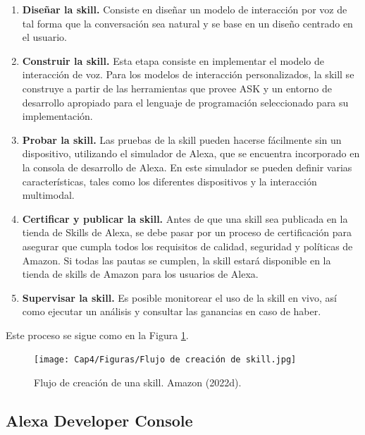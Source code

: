 \begin{enumerate}
  \item \textbf{Diseñar la skill.} Consiste en diseñar un modelo de interacción por voz de tal forma que la conversación sea natural y se base en un diseño centrado en el usuario. 
  \item \textbf{Construir la skill.} Esta etapa consiste en implementar el modelo de interacción de voz. Para los modelos de interacción personalizados, la skill se construye a partir de las herramientas que provee ASK y un entorno de desarrollo apropiado para el lenguaje de programación seleccionado para su implementación.
  \item \textbf{Probar la skill.} Las pruebas de la skill pueden hacerse fácilmente sin un dispositivo, utilizando el simulador de Alexa, que se encuentra incorporado en la consola de desarrollo de Alexa. En este simulador se pueden definir varias características, tales como los diferentes dispositivos y la interacción multimodal.
  \item \textbf{Certificar y publicar la skill.} Antes de que una skill sea publicada en la tienda de Skills de Alexa, se debe pasar por un proceso de certificación para asegurar que cumpla todos los requisitos de calidad, seguridad y políticas de Amazon. Si todas las pautas se cumplen, la skill estará disponible en la tienda de skills de Amazon para los usuarios de Alexa. 
  \item \textbf{Supervisar la skill.} Es posible monitorear el uso de la skill en vivo, así como ejecutar un análisis y consultar las ganancias en caso de haber. 
\end{enumerate}

Este proceso se sigue como en la Figura \ref{fig:42}.

\begin{figure}[H]
  \centering
  \texttt{[image: Cap4/Figuras/Flujo de creación de skill.jpg]}
  \caption{Flujo de creación de una skill. Amazon (2022d).}
  \label{fig:42}
\end{figure}


\subsection{Alexa Developer Console}
\label{ADCcapIV}

